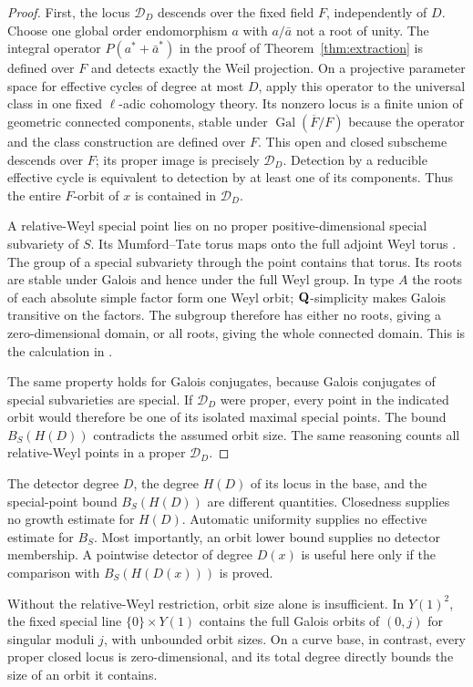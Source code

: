 \begin{proof}
First, the locus $\mathcal D_D$ descends over the fixed field $F$, independently of $D$. Choose one global order endomorphism $a$ with $a/\bar a$ not a root of unity. The integral operator $P(a^*+\bar a^*)$ in the proof of Theorem~\ref{thm:extraction} is defined over $F$ and detects exactly the Weil projection. On a projective parameter space for effective cycles of degree at most $D$, apply this operator to the universal class in one fixed $\ell$-adic cohomology theory. Its nonzero locus is a finite union of geometric connected components, stable under $\operatorname{Gal}(\overline F/F)$ because the operator and the class construction are defined over $F$. This open and closed subscheme descends over $F$; its proper image is precisely $\mathcal D_D$. Detection by a reducible effective cycle is equivalent to detection by at least one of its components. Thus the entire $F$-orbit of $x$ is contained in $\mathcal D_D$.

A relative-Weyl special point lies on no proper positive-dimensional special subvariety of $S$. Its Mumford--Tate torus maps onto the full adjoint Weyl torus \cite[Remark~5.8]{ChaiOort}. The group of a special subvariety through the point contains that torus. Its roots are stable under Galois and hence under the full Weyl group. In type $A$ the roots of each absolute simple factor form one Weyl orbit; $\mathbf Q$-simplicity makes Galois transitive on the factors. The subgroup therefore has either no roots, giving a zero-dimensional domain, or all roots, giving the whole connected domain. This is the calculation in \cite[Lemma~6.3]{ChaiOort}.

The same property holds for Galois conjugates, because Galois conjugates of special subvarieties are special. If $\mathcal D_D$ were proper, every point in the indicated orbit would therefore be one of its isolated maximal special points. The bound $B_S(H(D))$ contradicts the assumed orbit size. The same reasoning counts all relative-Weyl points in a proper $\mathcal D_D$.
\end{proof}

The detector degree $D$, the degree $H(D)$ of its locus in the base, and the special-point bound $B_S(H(D))$ are different quantities. Closedness supplies no growth estimate for $H(D)$. Automatic uniformity supplies no effective estimate for $B_S$. Most importantly, an orbit lower bound supplies no detector membership. A pointwise detector of degree $D(x)$ is useful here only if the comparison with $B_S(H(D(x)))$ is proved.

Without the relative-Weyl restriction, orbit size alone is insufficient. In $Y(1)^2$, the fixed special line $\{0\}\times Y(1)$ contains the full Galois orbits of $(0,j)$ for singular moduli $j$, with unbounded orbit sizes. On a curve base, in contrast, every proper closed locus is zero-dimensional, and its total degree directly bounds the size of an orbit it contains.
